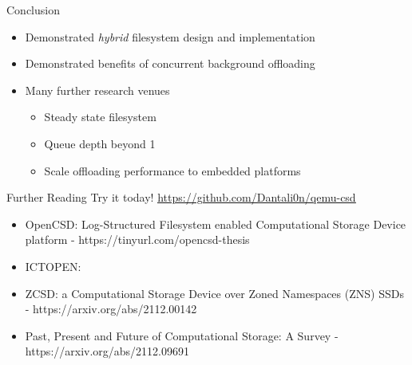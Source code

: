\documentclass{beamer}
\begin{document}
\begin{frame}{Conclusion}
	\begingroup
	\small
	\begin{itemize}
		\item Demonstrated \textit{hybrid} filesystem design and implementation
		\item Demonstrated benefits of concurrent background offloading
		\item Many further research venues
		\begin{itemize}
			\item Steady state filesystem
			\item Queue depth beyond  1
			\item Scale offloading performance to embedded platforms
		\end{itemize}
	\end{itemize}
	\endgroup
\end{frame}

\begin{frame}{Further Reading}
	\begingroup
	\small Try it today! \underline{\url{https://github.com/Dantali0n/qemu-csd}}
	\begin{itemize}
		\item OpenCSD: Log-Structured Filesystem enabled Computational
		Storage Device platform - https://tinyurl.com/opencsd-thesis
		\item ICTOPEN: 
		\item ZCSD: a Computational Storage Device over Zoned Namespaces (ZNS)
			SSDs - https://arxiv.org/abs/2112.00142
		\item Past, Present and Future of Computational Storage: A Survey
			- https://arxiv.org/abs/2112.09691
	\end{itemize}
	\endgroup
\end{frame}
\end{document}
